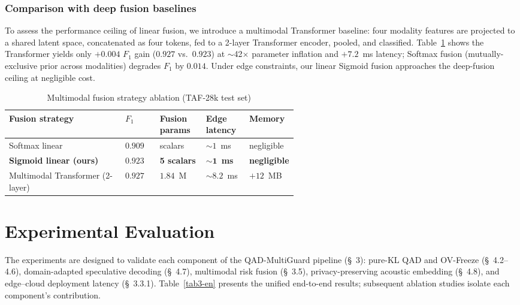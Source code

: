 \documentclass[11pt, a4paper]{article}
\begin{document}
\subsubsection{Comparison with deep fusion baselines}

To assess the performance ceiling of linear fusion, we introduce a multimodal Transformer baseline: four modality features are projected to a shared latent space, concatenated as four tokens, fed to a 2-layer Transformer encoder, pooled, and classified. Table~\ref{tab:fusion_ablation-en} shows the Transformer yields only $+0.004$ $F_1$ gain ($0.927$ vs.\ $0.923$) at $\sim$42$\times$ parameter inflation and $+7.2$~ms latency; Softmax fusion (mutually-exclusive prior across modalities) degrades $F_1$ by $0.014$. Under edge constraints, our linear Sigmoid fusion approaches the deep-fusion ceiling at negligible cost.

\begin{table}[htbp]
\centering
\caption{Multimodal fusion strategy ablation (TAF-28k test set)}
\label{tab:fusion_ablation-en}
\small
\renewcommand{\arraystretch}{1.2}
\begin{tabular}{l>{\centering\arraybackslash}p{0.12\linewidth}>{\centering\arraybackslash}p{0.16\linewidth}>{\centering\arraybackslash}p{0.15\linewidth}>{\centering\arraybackslash}p{0.13\linewidth}}
\toprule
\textbf{Fusion strategy} & \textbf{$F_1$} & \textbf{Fusion params} & \textbf{Edge latency} & \textbf{Memory} \\
\midrule
Softmax linear & $0.909$ & 5 scalars & $\sim 1$~ms & negligible \\
\rowcolor[gray]{0.93}\textbf{Sigmoid linear (ours)} & $\mathbf{0.923}$ & \textbf{5 scalars} & $\mathbf{\sim 1}$~\textbf{ms} & \textbf{negligible} \\
Multimodal Transformer (2-layer) & $0.927$ & $1.84$~M & $\sim 8.2$~ms & $+12$~MB \\
\bottomrule
\end{tabular}
\end{table}

\section{Experimental Evaluation}

The experiments are designed to validate each component of the QAD-MultiGuard pipeline (\S~3): pure-KL QAD and OV-Freeze (\S~4.2--4.6), domain-adapted speculative decoding (\S~4.7), multimodal risk fusion (\S~3.5), privacy-preserving acoustic embedding (\S~4.8), and edge--cloud deployment latency (\S~3.3.1). Table~\ref{tab3-en} presents the unified end-to-end results; subsequent ablation studies isolate each component's contribution.
\end{document}

